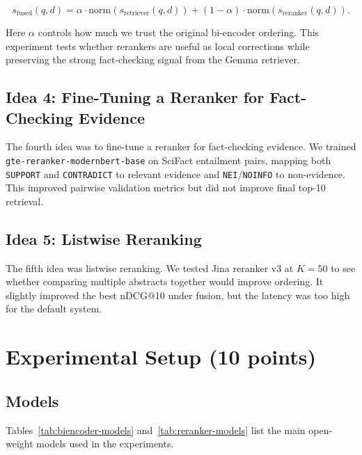 \documentclass[11pt,a4paper]{article}
\begin{document}
\begin{equation}
s_{\mathrm{fused}}(q,d) =
\alpha \cdot \mathrm{norm}(s_{\mathrm{retriever}}(q,d)) +
(1-\alpha) \cdot \mathrm{norm}(s_{\mathrm{reranker}}(q,d)).
\end{equation}

Here $\alpha$ controls how much we trust the original bi-encoder ordering. This experiment tests whether rerankers are useful as local corrections while preserving the strong fact-checking signal from the Gemma retriever.

\subsection{Idea 4: Fine-Tuning a Reranker for Fact-Checking Evidence}

The fourth idea was to fine-tune a reranker for fact-checking evidence. We trained \texttt{gte-reranker-modernbert-base} on SciFact entailment pairs, mapping both \texttt{SUPPORT} and \texttt{CONTRADICT} to relevant evidence and \texttt{NEI}/\texttt{NOINFO} to non-evidence. This improved pairwise validation metrics but did not improve final top-10 retrieval.

\subsection{Idea 5: Listwise Reranking}

The fifth idea was listwise reranking. We tested Jina reranker v3 at $K=50$ to see whether comparing multiple abstracts together would improve ordering. It slightly improved the best nDCG@10 under fusion, but the latency was too high for the default system.

\section{Experimental Setup (10 points)}

\subsection{Models}
Tables~\ref{tab:biencoder-models} and~\ref{tab:reranker-models} list the main open-weight models used in the experiments.
\end{document}
